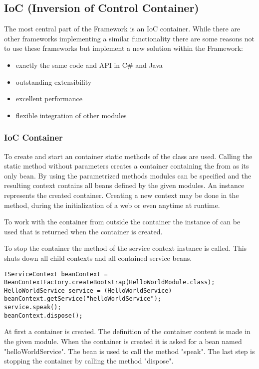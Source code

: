 \subsection{IoC (Inversion of Control Container)}
The most central part of the \AMBETH{} Framework is an IoC container. While there are other frameworks implementing a similar functionality there are some reasons not to use these frameworks but implement a new solution within the \AMBETH{} Framework:

\begin{itemize}
	\item exactly the same code and API in C\# and Java
	\item outstanding extensibility
	\item excellent performance
	\item flexible integration of other \AMBETH{} modules
\end{itemize}

\subsubsection{IoC Container}
\TODO

To create and start an \AMBETH{} container static methods of the class  are used. Calling the static method  without parameters creates a container containing the  from \AMBETH{} as its only bean. By using the parametrized methods modules can be specified and the resulting context contains all beans defined by the given modules. An instance  represents the created container.
Creating a new context may be done in the  method, during the initialization of a web  or even anytime at runtime.

To work with the container from outside the container the instance of  can be used that is returned when the container is created.

To stop the \AMBETH{} container the method  of the service context instance is called. This shuts down all child contexts and all contained service beans.


\begin{lstlisting}[style=Java,caption={Start, use and stop an Ambeth Bean Container}]
IServiceContext beanContext = BeanContextFactory.createBootstrap(HelloWorldModule.class);
HelloWorldService service = (HelloWorldService) beanContext.getService("helloWorldService");
service.speak();
beanContext.dispose();
\end{lstlisting}
At first a container is created. The definition of the container content is made in the given module. When the container is created it is asked for a bean named "helloWorldService". The bean is used to call the method "speak". The last step is stopping the container by calling the method "dispose".

